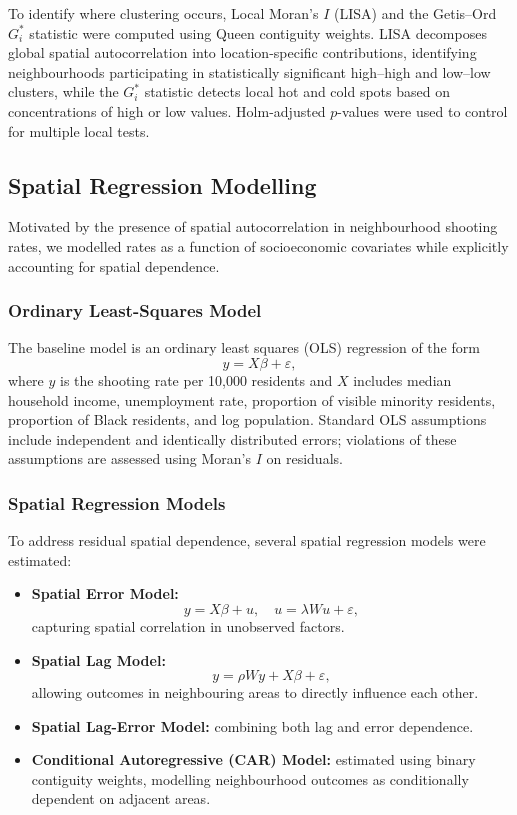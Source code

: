 \documentclass{article}
\begin{document}
\noindent
To identify where clustering occurs, Local Moran’s $I$ (LISA) and the Getis--Ord $G_i^*$ statistic were computed using Queen contiguity weights. LISA decomposes global spatial autocorrelation into location-specific contributions, identifying neighbourhoods participating in statistically significant high--high and low--low clusters, while the $G_i^*$ statistic detects local hot and cold spots based on concentrations of high or low values. Holm-adjusted $p$-values were used to control for multiple local tests.

\subsection{Spatial Regression Modelling}

\noindent Motivated by the presence of spatial autocorrelation in neighbourhood shooting rates, we modelled rates as a function of socioeconomic covariates while explicitly accounting for spatial dependence.

\subsubsection{Ordinary Least-Squares Model}

\noindent The baseline model is an ordinary least squares (OLS) regression of the form
\[
y = X\beta + \varepsilon,
\]
where $y$ is the shooting rate per 10{,}000 residents and $X$ includes median household income, unemployment rate, proportion of visible minority residents, proportion of Black residents, and log population. Standard OLS assumptions include independent and identically distributed errors; violations of these assumptions are assessed using Moran’s $I$ on residuals.

\subsubsection{Spatial Regression Models}

\noindent To address residual spatial dependence, several spatial regression models were estimated:

\begin{itemize}
    \item \textbf{Spatial Error Model:}
    \[
    y = X\beta + u, \quad u = \lambda Wu + \varepsilon,
    \]
    capturing spatial correlation in unobserved factors.

    \item \textbf{Spatial Lag Model:}
    \[
    y = \rho Wy + X\beta + \varepsilon,
    \]
    allowing outcomes in neighbouring areas to directly influence each other.

    \item \textbf{Spatial Lag-Error Model:} combining both lag and error dependence.

    \item \textbf{Conditional Autoregressive (CAR) Model:} estimated using binary contiguity weights, modelling neighbourhood outcomes as conditionally dependent on adjacent areas.
\end{itemize}
\end{document}
